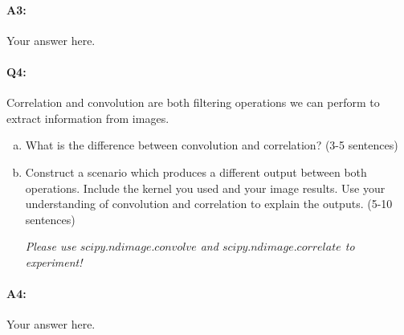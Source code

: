 \pagebreak
\paragraph{A3:} Your answer here.



\pagebreak
\paragraph{Q4:} Correlation and convolution are both filtering operations we can perform to extract information from images.
\begin{enumerate}[(a)]
    \item
    What is the difference between convolution and correlation? (3-5 sentences)

    \item
    Construct a scenario which produces a different output between both operations. Include the kernel you used and your image results. Use your understanding of convolution and correlation to explain the outputs. (5-10 sentences)

    \emph{Please use \href{https://docs.scipy.org/doc/scipy/reference/generated/scipy.ndimage.convolve.html}{$scipy.ndimage.convolve$} and \href{https://docs.scipy.org/doc/scipy/reference/generated/scipy.ndimage.correlate.html}{$scipy.ndimage.correlate$} to experiment!}

\end{enumerate}


\paragraph{A4:} Your answer here.


